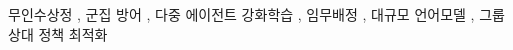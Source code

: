 
\begin{keyword}
무인수상정 \sep
군집 방어 \sep
다중 에이전트 강화학습 \sep
임무배정 \sep
대규모 언어모델 \sep
그룹 상대 정책 최적화
\end{keyword}
